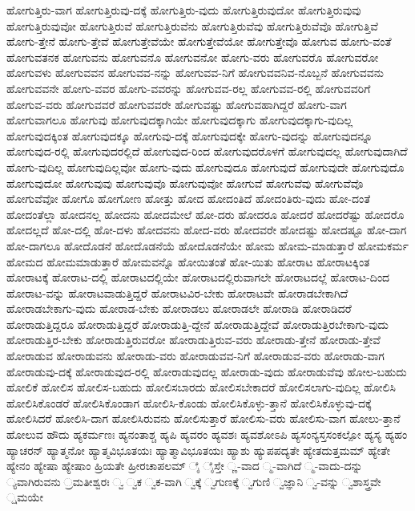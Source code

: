 {ಹೋಗುತ್ತಿರು-ವಾಗ
ಹೋಗುತ್ತಿರುವು-ದಕ್ಕೆ
ಹೋಗುತ್ತಿರು-ವುದು
ಹೋಗುತ್ತಿರುವುದೋ
ಹೋಗುತ್ತಿರುವುವು
ಹೋಗುತ್ತಿರುವುವೋ
ಹೋಗುತ್ತಿರುವೆ
ಹೋಗುತ್ತಿರುವೆನು
ಹೋಗುತ್ತಿರುವೆವು
ಹೋಗುತ್ತಿರುವೆವೊ
ಹೋಗುತ್ತಿವೆ
ಹೋಗು-ತ್ತೇನೆ
ಹೋಗು-ತ್ತೇವೆ
ಹೋಗುತ್ತೇವೆಯೇ
ಹೋಗುತ್ತೇವೆಯೋ
ಹೋಗುತ್ತೇವೊ
ಹೋಗುವ
ಹೋಗು-ವಂತೆ
ಹೋಗುವತನಕ
ಹೋಗುವನು
ಹೋಗುವನೊ
ಹೋಗುವನೋ
ಹೋಗು-ವರು
ಹೋಗುವರೊ
ಹೋಗುವರೋ
ಹೋಗುವಳು
ಹೋಗುವವನ
ಹೋಗುವವ-ನನ್ನು
ಹೋಗುವವ-ನಿಗೆ
ಹೋಗುವವನಿವ-ನೊಬ್ಬನೆ
ಹೋಗುವವನು
ಹೋಗುವವನೇ
ಹೋಗು-ವವರ
ಹೋಗು-ವವರನ್ನು
ಹೋಗುವವ-ರಲ್ಲ
ಹೋಗುವವ-ರಲ್ಲಿ
ಹೋಗುವವರಿಗೆ
ಹೋಗುವ-ವರು
ಹೋಗುವವರೆ
ಹೋಗುವವರೇ
ಹೋಗುವಷ್ಟು
ಹೋಗುವಹಾಗಿದ್ದರೆ
ಹೋಗು-ವಾಗ
ಹೋಗುವಾಗಲೂ
ಹೋಗುವು
ಹೋಗುವುದಕ್ಕಾಗಿಯೇ
ಹೋಗುವುದಕ್ಕಾಗು
ಹೋಗುವುದಕ್ಕಾಗು-ವುದಿಲ್ಲ
ಹೋಗುವುದಕ್ಕಿಂತ
ಹೋಗುವುದಕ್ಕೂ
ಹೋಗುವು-ದಕ್ಕೆ
ಹೋಗುವುದಕ್ಕೇ
ಹೋಗು-ವುದನ್ನು
ಹೋಗುವುದನ್ನೂ
ಹೋಗುವುದ-ರಲ್ಲಿ
ಹೋಗುವುದರಲ್ಲಿದೆ
ಹೋಗುವುದ-ರಿಂದ
ಹೋಗುವುದರೊಳಗೆ
ಹೋಗುವುದಲ್ಲ
ಹೋಗುವುದಾಗಿದೆ
ಹೋಗು-ವುದಿಲ್ಲ
ಹೋಗುವುದಿಲ್ಲವೋ
ಹೋಗು-ವುದು
ಹೋಗುವುದೂ
ಹೋಗುವುದೆ
ಹೋಗುವುದೇ
ಹೋಗುವುದೊ
ಹೋಗುವುದೋ
ಹೋಗುವುವು
ಹೋಗುವುವೊ
ಹೋಗುವುವೋ
ಹೋಗುವೆ
ಹೋಗುವೆವು
ಹೋಗುವೆವೊ
ಹೋಗುವೆವೋ
ಹೋಗೊ
ಹೋಗೋಣ
ಹೋತ್ತು
ಹೋದ
ಹೋದಂತಿದೆ
ಹೋದಂತಿರು-ವುದು
ಹೋ-ದಂತೆ
ಹೋದಂತೆಲ್ಲಾ
ಹೋದನಲ್ಲ
ಹೋದನು
ಹೋದಮೇಲೆ
ಹೋ-ದರು
ಹೋದರೂ
ಹೋದರೆ
ಹೋದರೆಷ್ಟು
ಹೋದರೊ
ಹೋದಲ್ಲದೆ
ಹೋ-ದಲ್ಲಿ
ಹೋ-ದಳು
ಹೋದವನು
ಹೋದ-ವರು
ಹೋದವರೇ
ಹೋದಷ್ಟು
ಹೋದಷ್ಟೂ
ಹೋ-ದಾಗ
ಹೋ-ದಾಗಲೂ
ಹೋದೊಡನೆ
ಹೋದೊಡನೆಯೆ
ಹೋದೊಡನೆಯೇ
ಹೋಮ
ಹೋಮ-ಮಾಡುತ್ತಾರೆ
ಹೋಮಕರ್ಮ
ಹೋಮದ
ಹೋಮಮಾಡುತ್ತಾರೆ
ಹೋಮವನ್ನೊ
ಹೋಯಿತಂತೆ
ಹೋ-ಯಿತು
ಹೋರಾಟ
ಹೋರಾಟಕ್ಕಿಂತ
ಹೋರಾಟಕ್ಕೆ
ಹೋರಾಟ-ದಲ್ಲಿ
ಹೋರಾಟದಲ್ಲಿಯೇ
ಹೋರಾಟದಲ್ಲಿರುವಾಗಲೇ
ಹೋರಾಟದಲ್ಲೆ
ಹೋರಾಟ-ದಿಂದ
ಹೋರಾಟ-ವನ್ನು
ಹೋರಾಟವಾಡುತ್ತಿದ್ದರೆ
ಹೋರಾಟವಿರ-ಬೇಕು
ಹೋರಾಟವೇ
ಹೋರಾಡಬೇಕಾಗಿದೆ
ಹೋರಾಡಬೇಕಾಗು-ವುದು
ಹೋರಾಡ-ಬೇಕು
ಹೋರಾಡಲು
ಹೋರಾಡಲೇ
ಹೋರಾಡಿ
ಹೋರಾಡಿದರೆ
ಹೋರಾಡುತ್ತಿದ್ದರೂ
ಹೋರಾಡುತ್ತಿದ್ದರೆ
ಹೋರಾಡುತ್ತಿ-ದ್ದೇನೆ
ಹೋರಾಡುತ್ತಿದ್ದೇವೆ
ಹೋರಾಡುತ್ತಿರಬೇಕಾಗು-ವುದು
ಹೋರಾಡುತ್ತಿರ-ಬೇಕು
ಹೋರಾಡುತ್ತಿರುವರೋ
ಹೋರಾಡುತ್ತಿರುವ-ವರು
ಹೋರಾಡು-ತ್ತೇನೆ
ಹೋರಾಡು-ತ್ತೇವೆ
ಹೋರಾಡುವ
ಹೋರಾಡುವನು
ಹೋರಾಡು-ವರು
ಹೋರಾಡುವವ-ನಿಗೆ
ಹೋರಾಡುವ-ವರು
ಹೋರಾಡು-ವಾಗ
ಹೋರಾಡುವು-ದಕ್ಕೆ
ಹೋರಾಡುವುದ-ರಲ್ಲಿ
ಹೋರಾಡುವುದಲ್ಲ
ಹೋರಾಡು-ವುದು
ಹೋರಾಡುವೆವು
ಹೋಲ-ಬಹುದು
ಹೋಲಿಕೆ
ಹೋಲಿಸ
ಹೋಲಿಸ-ಬಹುದು
ಹೋಲಿಸಬಾರದು
ಹೋಲಿಸಬೇಕಾದರೆ
ಹೋಲಿಸಲಾಗು-ವುದಿಲ್ಲ
ಹೋಲಿಸಿ
ಹೋಲಿಸಿಕೊಂಡರೆ
ಹೋಲಿಸಿಕೊಂಡಾಗ
ಹೋಲಿಸಿ-ಕೊಂಡು
ಹೋಲಿಸಿಕೊಳ್ಳು-ತ್ತಾನೆ
ಹೋಲಿಸಿಕೊಳ್ಳುವು-ದಕ್ಕೆ
ಹೋಲಿಸಿದರೆ
ಹೋಲಿಸಿ-ದಾಗ
ಹೋಲಿಸಿರುವನು
ಹೋಲಿಸುತ್ತಾರೆ
ಹೋಲಿಸು-ವರು
ಹೋಲಿಸು-ವಾಗ
ಹೋಲು-ತ್ತಾನೆ
ಹೋಲುವ
ಹೌದು
ಹ್ಯಕರ್ಮಣಃ
ಹ್ಯನಂತಾಶ್ಚ
ಹ್ಯಪಿ
ಹ್ಯವರಂ
ಹ್ಯವಶಃ
ಹ್ಯವಶೋಽಪಿ
ಹ್ಯಸಂನ್ಯಸ್ತಸಂಕಲ್ಪೋ
ಹ್ಯಸ್ಯ
ಹ್ಯಹಂ
ಹ್ಯಾಚರನ್
ಹ್ಯಾತ್ಮನೋ
ಹ್ಯಾತ್ಮವಿಭೂತಯಃ
ಹ್ಯಾತ್ಮಾವಿಭೂತಯಃ
ಹ್ಯಾಶು
ಹ್ಯುಪಪದ್ಯತೇ
ಹ್ಯೇತದುತ್ತಮಮ್
ಹ್ಯೇತೇ
ಹ್ಯೇನಂ
ಹ್ಯೇಷಾ
ಹ್ಯೇಷಾಂ
ಹ್ರಿಯತೇ
ಹ್ರೀರಚಾಪಲಮ್
ೈ
ೈಸ್ತೇ
್ಣ-ವಾದ
್ಮ-ವಾಗಿದೆ
್ಮ-ವಾದು-ದನ್ನು
್ಯವಾಗಿರುವನು
್ರಮತೀಶ್ವರಃ
್ವ
್ವಕ
್ವಕ-ವಾಗಿ
್ವಕ್ಕೆ
್ವಗುಣಕ್ಕೆ
್ವಗುಣಿ
್ವಜ್ಞಾನಿ
್ವ-ವನ್ನು
್ವಶಾಸ್ತ್ರವೇ
್ಷಮಯೇ
}
